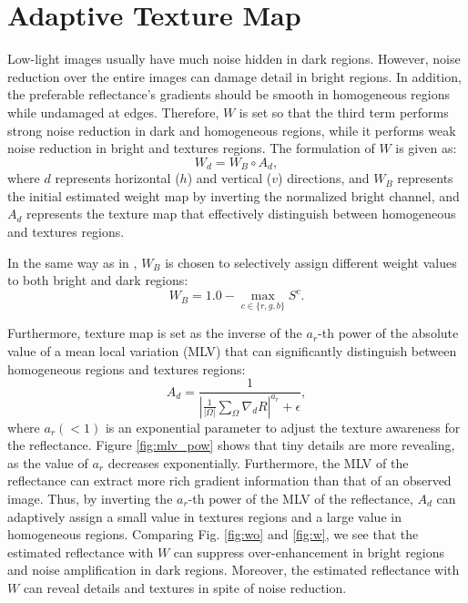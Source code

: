\section{Adaptive Texture Map} \label{sec:adaptive}
Low-light images usually have much noise hidden in dark regions. However, noise reduction over the entire images can damage detail in bright regions. In addition, the preferable reflectance's gradients should be smooth in homogeneous regions while undamaged at edges. 
Therefore, $W$ is set so that the third term performs strong noise reduction in dark and homogeneous regions, while it performs weak noise reduction in bright and textures regions. The formulation of $W$ is given as:
\begin{equation}
W_{d} = W_{B} \circ A_{d}, \label{eq: adaptive_texture}
\end{equation}
where $d$ represents horizontal ($h$) and vertical ($v$) directions, and $W_{B}$ represents the initial estimated weight map by inverting the normalized bright channel, and $A_{d}$ represents the texture map that effectively distinguish between homogeneous and textures regions.\par In the same way as in \cite{activation}, $W_{B}$ is chosen to selectively assign different weight values to both bright and dark regions:
\begin{equation}
W_{B} = 1.0 - \max_{c \in \{r, g, b\}}S^{c}. \label{eq: initial_weight}
\end{equation}
\par
Furthermore, texture map is set as the inverse of the $a_{r}$-th power of the absolute value of a mean local variation (MLV) \cite{jiep} that can significantly distinguish between homogeneous regions and textures regions:
\begin{equation}
A_{d} = \frac{1}{\left |\frac{1}{|\Omega|}\sum_{\Omega}\nabla_{d}{R} \right|^{a_{r}} + \epsilon}, \label{eq: mlv}
\end{equation}
where $a_{r} (< 1)$ is an exponential parameter to adjust the texture awareness for the reflectance. 
Figure \ref{fig:mlv_pow} shows that tiny details are more revealing, as the value of $a_{r}$ decreases exponentially. Furthermore, the MLV of the reflectance can extract more rich gradient information than that of an observed image. Thus, by inverting the $a_{r}$-th power of the MLV of the reflectance, $A_{d}$ can adaptively assign a small value in textures regions and a large value in homogeneous regions. 
Comparing Fig. \ref{fig:wo} and \ref{fig:w}, we see that the estimated reflectance with $W$ can suppress over-enhancement in bright regions and noise amplification in dark regions. Moreover, the estimated reflectance with $W$ can reveal details and textures in spite of noise reduction. 
